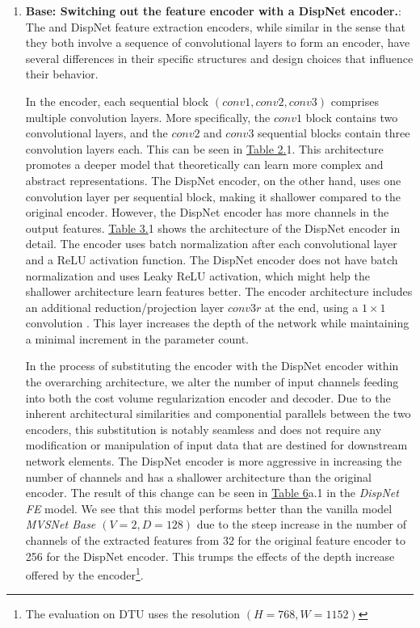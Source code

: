 \begin{enumerate}
    \item \textbf{{\mvsn} Base: Switching out the {\mvsn} feature encoder with a DispNet encoder.}: 
    The {\mvsn} and DispNet feature extraction encoders, while similar in the sense that they both involve a sequence of convolutional layers to form an encoder, have several differences in their specific structures and design choices that influence their behavior.
    
    In the {\mvsn} encoder, each sequential block $(conv1, conv2, conv3)$ comprises multiple convolution layers. More specifically, the $conv1$ block contains two convolutional layers, and the $conv2$ and $conv3$ sequential blocks contain three convolution layers each. This can be seen in \hyperref[tab:arch-mvsn]{Table 2.}{1}. This architecture promotes a deeper model that theoretically can learn more complex and abstract representations. The DispNet encoder, on the other hand, uses one convolution layer per sequential block, making it shallower compared to the original {\mvsn} encoder. However, the DispNet encoder has more channels in the output features. \hyperref[tab:arch-rmvd]{Table 3.}{1} shows the architecture of the DispNet encoder in detail. The {\mvsn} encoder uses batch normalization after each convolutional layer and a ReLU activation function. The DispNet encoder does not have batch normalization and uses Leaky ReLU activation, which might help the shallower architecture learn features better. The {\mvsn} encoder architecture includes an additional reduction/projection layer $conv3r$ at the end, using a $1\times1$ convolution \cite{lin2014network, szegedy2014going}. This layer increases the depth of the network while maintaining a minimal increment in the parameter count.\par
    In the process of substituting the {\mvsn} encoder with the DispNet encoder within the overarching {\mvsn} architecture, we alter the number of input channels feeding into both the {\mvsn} cost volume regularization encoder and decoder. Due to the inherent architectural similarities and componential parallels between the two encoders, this substitution is notably seamless and does not require any modification or manipulation of input data that are destined for downstream network elements. The DispNet encoder is more aggressive in increasing the number of channels and has a shallower architecture than the original {\mvsn} encoder. The result of this change can be seen in \hyperref[tab:feat-enc]{Table 6}{a.1} in the \textit{DispNet FE} model. We see that this model performs better than the vanilla {\mvsn} model \textit{MVSNet Base $(V=2, D=128)$} due to the steep increase in the number of channels of the extracted features from 32 for the original {\mvsn} feature encoder to 256 for the DispNet encoder. This trumps the effects of the depth increase offered by the {\mvsn} encoder\footnote{The evaluation on DTU uses the resolution $(H=768, W=1152)$}.


\end{enumerate}
